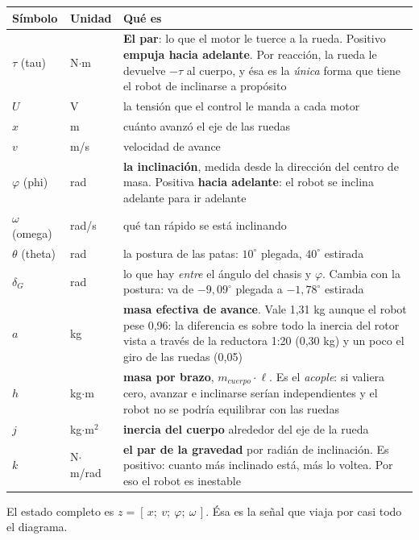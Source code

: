 \documentclass[11pt,a4paper]{article}
\begin{document}
\begin{center}
\small
\begin{tabular}{@{}llp{9.3cm}@{}}
\toprule
\textbf{Símbolo} & \textbf{Unidad} & \textbf{Qué es} \\
\midrule
$\tau$ (tau) & N$\cdot$m & \textbf{El par}: lo que el motor le tuerce a la rueda. Positivo
\textbf{empuja hacia adelante}. Por reacción, la rueda le devuelve $-\tau$ al cuerpo, y ésa es
la \emph{única} forma que tiene el robot de inclinarse a propósito \\
$U$ & V & la tensión que el control le manda a cada motor \\
$x$ & m & cuánto avanzó el eje de las ruedas \\
$v$ & m/s & velocidad de avance \\
$\varphi$ (phi) & rad & \textbf{la inclinación}, medida desde la dirección del centro de masa.
Positiva \textbf{hacia adelante}: el robot se inclina adelante para ir adelante \\
$\omega$ (omega) & rad/s & qué tan rápido se está inclinando \\
$\theta$ (theta) & rad & la postura de las patas: $10^\circ$ plegada, $40^\circ$ estirada \\
$\delta_G$ & rad & lo que hay \emph{entre} el ángulo del chasis y $\varphi$. Cambia con la
postura: va de $-9{,}09^\circ$ plegada a $-1{,}78^\circ$ estirada \\
\midrule
$a$ & kg & \textbf{masa efectiva de avance}. Vale 1,31 kg aunque el robot pese 0,96: la diferencia
es sobre todo la inercia del rotor vista a través de la reductora 1:20 (0,30 kg) y un poco el
giro de las ruedas (0,05) \\
$h$ & kg$\cdot$m & \textbf{masa por brazo}, $m_{cuerpo}\cdot\ell$. Es el \emph{acople}: si valiera
cero, avanzar e inclinarse serían independientes y el robot no se podría equilibrar con las ruedas \\
$j$ & kg$\cdot$m$^2$ & \textbf{inercia del cuerpo} alrededor del eje de la rueda \\
$k$ & N$\cdot$m/rad & \textbf{el par de la gravedad} por radián de inclinación. Es positivo: cuanto
más inclinado está, más lo voltea. Por eso el robot es inestable \\
\bottomrule
\end{tabular}
\end{center}

El estado completo es $z = [\,x;\ v;\ \varphi;\ \omega\,]$. Ésa es la señal que viaja por casi
todo el diagrama.
\end{document}
